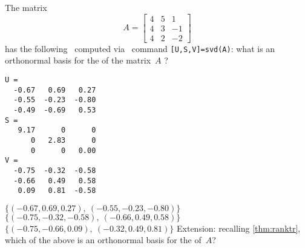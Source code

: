 \begin{activity}
The matrix
\begin{equation*}
A=\begin{bmatrix} 4&5&1
\\4&3&-1
\\4&2&-2 \end{bmatrix}
\end{equation*}
has the following \svd\ computed via \script\ command \verb|[U,S,V]=svd(A)|: what is an orthonormal basis for the  of the matrix~\(A\) \twodp?
\begin{verbatim}
U =
  -0.67   0.69   0.27
  -0.55  -0.23  -0.80
  -0.49  -0.69   0.53
S =
   9.17      0      0
      0   2.83      0
      0      0   0.00
V =
  -0.75  -0.32  -0.58
  -0.66   0.49   0.58
   0.09   0.81  -0.58
\end{verbatim}
{\(\{(-0.67,0.69,0.27),\ (-0.55,-0.23,-0.80)\}\)}
{\(\{(-0.75,-0.32,-0.58),\ (-0.66,0.49,0.58)\}\)}
{\(\{(-0.75,-0.66,0.09),\ (-0.32,0.49,0.81)\}\)}
Extension: recalling \cref{thm:ranktr}, which of the above is an orthonormal basis for the  of~\(A\)?
\end{activity}




